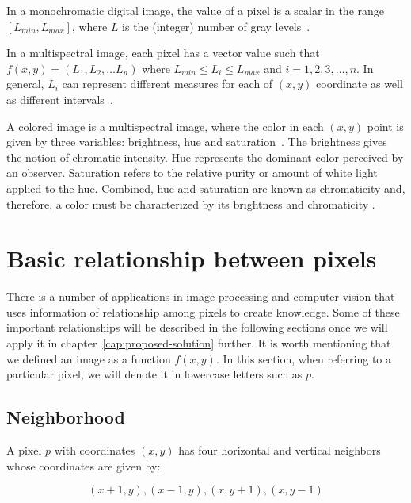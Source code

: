 In a monochromatic digital image, the value of a pixel is a scalar in the range $[L_{min}, L_{max}]$, where $L$ is the (integer) number of gray levels~\citep{pedrini:08}.

In a multispectral image, each pixel has a vector value such that $f(x, y) = (L_1, L_2, \ldots L_n)$ where $L_{min} \leq L_i \leq L_{max}$ and $i = 1, 2, 3, \ldots, n$. In general, $L_i$ can represent different measures for each of $(x, y)$ coordinate as well as different intervals~\citep{pedrini:08}.

A colored image is a multispectral image, where the color in each $(x, y)$ point is given by three variables: brightness, hue and saturation~\citep{pedrini:08}. The brightness gives the notion of chromatic intensity. Hue represents the dominant color perceived by an observer. Saturation refers to the relative purity or amount of white light applied to the hue. Combined, hue and saturation are known as chromaticity and, therefore, a color must be characterized by its brightness and chromaticity \citep{gonzalez:02}.


\section{Basic relationship between pixels}
\label{sec:image_components_relation}
There is a number of applications in image processing and computer vision that uses information of relationship among pixels to create knowledge. Some of these important relationships will be described in the following sections once we will apply it in chapter~\ref{cap:proposed-solution} further. It is worth mentioning that we defined an image as a function $f(x, y)$. In this section, when referring to a particular pixel, we will denote it in lowercase letters such as $p$.



\subsection{Neighborhood}
\label{sec:neighborhood}
A pixel $p$ with coordinates $(x, y)$ has four horizontal and vertical neighbors whose coordinates are given by:

\begin{equation*}
    (x + 1, y), (x - 1, y), (x, y + 1), (x, y - 1)
    \label{eq:n4_neighbors}
\end{equation*}

